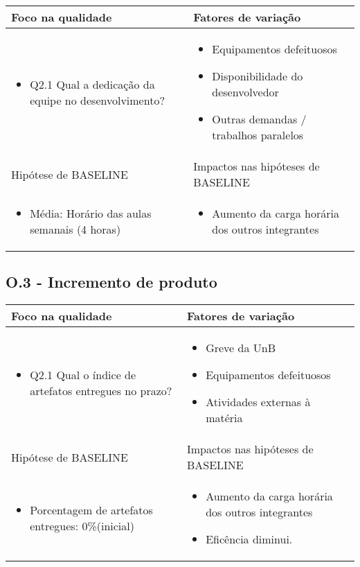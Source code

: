 	\begin{tabular}{ |p{4cm}|p{6cm}|  }
	 \hline
	 Foco na qualidade 		& 		Fatores de variação \\
	 \hline
	 \begin{itemize} \item Q2.1 Qual a dedicação da equipe no desenvolvimento? \end{itemize} & \begin{itemize} \item Equipamentos defeituosos \item Disponibilidade do desenvolvedor \end{itemize} \begin{itemize} \item Outras demandas / trabalhos paralelos \end{itemize}\\
	 \hline
	 Hipótese de BASELINE 		& 		Impactos nas hipóteses de BASELINE \\
	 \hline
	 \begin{itemize} \item Média: Horário das aulas semanais (4 horas)  \end{itemize} 		& 		\begin{itemize} \item Aumento da carga horária dos outros integrantes \end{itemize} \\
	 \hline
	\end{tabular}

\subsection{O.3 - Incremento de produto}

	\begin{tabular}{ |p{6cm}|p{6cm}|  }
	 \hline
	 Foco na qualidade 		& 		Fatores de variação \\
	 \hline
	 \begin{itemize} \item Q2.1 Qual o índice de artefatos entregues no prazo?\end{itemize} 	
	  & \begin{itemize} \item Greve da UnB \item Equipamentos defeituosos \item Atividades externas à matéria \end{itemize}\\
	 \hline
	 Hipótese de BASELINE 		& 		Impactos nas hipóteses de BASELINE \\
	 \hline
	 \begin{itemize} \item Porcentagem de artefatos entregues: 0\%(inicial) \end{itemize} & \begin{itemize} \item Aumento da carga horária dos outros integrantes \item Eficência diminui.\end{itemize} \\
	 \hline
	\end{tabular}
